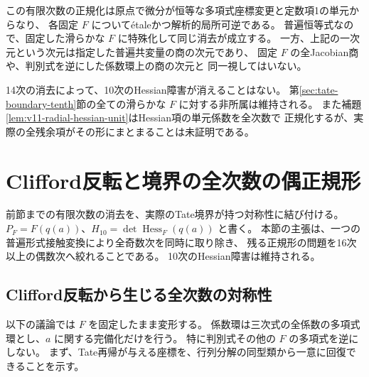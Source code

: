 \documentclass[a4paper,11pt]{ltjsarticle}
\theoremstyle{definition}
\begin{document}
この有限次数の正規化は原点で微分が恒等な多項式座標変更と定数項1の単元からなり、
各固定 $F$ についてétaleかつ解析的局所可逆である。
普遍恒等式なので、固定した滑らかな $F$ に特殊化して同じ消去が成立する。
一方、上記の一次元という次元は指定した普遍共変量の商の次元であり、
固定 $F$ の全Jacobian商や、判別式を逆にした係数環上の商の次元と
同一視してはいない。

14次の消去によって、10次のHessian障害が消えることはない。
第\ref{sec:tate-boundary-tenth}節の全ての滑らかな $F$ に対する非所属は維持される。
また補題\ref{lem:v11-radial-hessian-unit}はHessian項の単元係数を全次数で
正規化するが、実際の全残余項がその形にまとまることは未証明である。

\clearpage
\section{Clifford反転と境界の全次数の偶正規形}
\label{sec:all-order-parity}

前節までの有限次数の消去を、実際のTate境界が持つ対称性に結び付ける。
$P_F=F(q(a))$、$H_{10}=\det\operatorname{Hess}_F(q(a))$ と書く。
本節の主張は、一つの普遍形式接触変換により全奇数次を同時に取り除き、
残る正規形の問題を16次以上の偶数次へ絞れることである。
10次のHessian障害は維持される。

\subsection{Clifford反転から生じる全次数の対称性}
\label{subsec:v12-parity}

以下の議論では $F$ を固定したまま変形する。
係数環は三次式の全係数の多項式環とし、$a$ に関する完備化だけを行う。
特に判別式その他の $F$ の多項式を逆にしない。
まず、Tate再帰が与える座標を、行列分解の同型類から一意に回復できることを示す。
\end{document}
